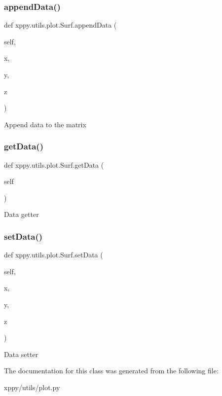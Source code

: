 \subsubsection{\texorpdfstring{append\+Data()}{appendData()}}
{\footnotesize\ttfamily def xppy.\+utils.\+plot.\+Surf.\+append\+Data (\begin{DoxyParamCaption}\item[{}]{self,  }\item[{}]{x,  }\item[{}]{y,  }\item[{}]{z }\end{DoxyParamCaption})}

\begin{DoxyVerb}Append data to the matrix 
\end{DoxyVerb}
 \mbox{\label{classxppy_1_1utils_1_1plot_1_1_surf_ac6c49f95f52fa80262260574bb854be3}} 
\subsubsection{\texorpdfstring{get\+Data()}{getData()}}
{\footnotesize\ttfamily def xppy.\+utils.\+plot.\+Surf.\+get\+Data (\begin{DoxyParamCaption}\item[{}]{self }\end{DoxyParamCaption})}

\begin{DoxyVerb}Data getter
\end{DoxyVerb}
 \mbox{\label{classxppy_1_1utils_1_1plot_1_1_surf_afffbbdfcae7540bc9f422a22662557bf}} 
\subsubsection{\texorpdfstring{set\+Data()}{setData()}}
{\footnotesize\ttfamily def xppy.\+utils.\+plot.\+Surf.\+set\+Data (\begin{DoxyParamCaption}\item[{}]{self,  }\item[{}]{x,  }\item[{}]{y,  }\item[{}]{z }\end{DoxyParamCaption})}

\begin{DoxyVerb}Data setter
\end{DoxyVerb}
 

The documentation for this class was generated from the following file\+:\begin{DoxyCompactItemize}
\item 
xppy/utils/plot.\+py\end{DoxyCompactItemize}
